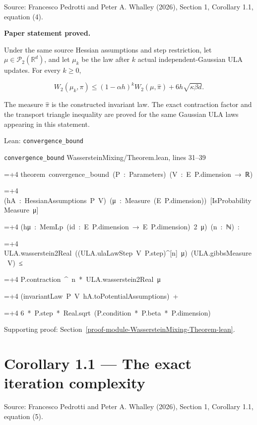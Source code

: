 \documentclass[11pt,a4paper]{report}
\newlength{\leancharwidth}
\newenvironment{leancode}{\par\smallskip\begingroup\ttfamily\footnotesize\raggedright
  \settowidth{\leancharwidth}{M}\setlength{\parskip}{0pt}\setlength{\parindent}{0pt}
  \frenchspacing}{\par\endgroup\smallskip}
\newcommand{\leanline}[2]{\hangindent=\dimexpr#1\leancharwidth+4\leancharwidth\relax
  \hangafter=1\noindent\hspace*{#1\leancharwidth}#2\par}
\newcommand{\leansource}[1]{\par{\footnotesize\color{leanmuted}#1}\par}
\begin{document}
Source: Francesco Pedrotti and Peter A. Whalley (2026), Section 1, Corollary 1.1, equation (4).



\textbf{Paper statement proved.}



Under the same source Hessian assumptions and step restriction,
let \(\mu\in\mathcal P_2(\mathbb R^d)\), and let \(\mu_k\) be the law after
\(k\) actual independent-Gaussian ULA updates. For every \(k\ge0\),


\[W_2(\mu_k,\pi)\le(1-\alpha h)^kW_2(\mu,\widehat\pi)
+6h\sqrt{\kappa\beta d}.\]


The measure \(\widehat\pi\) is the constructed invariant law. The exact
contraction factor and the transport triangle inequality are proved for the
same Gaussian ULA laws appearing in this statement.

\begin{leanbox}{Lean: \texttt{convergence\_\allowbreak{}bound}}
\leansource{\texttt{convergence\_\allowbreak{}bound} \quad WassersteinMixing/\allowbreak{}Theorem.lean, lines 31–39}
\begin{leancode}
\leanline{0}{theorem\ convergence\_bound\ (P\ :\ Parameters)\ (V\ :\ E\ P.dimension\ →\ ℝ)}
\leanline{4}{(hA\ :\ HessianAssumptions\ P\ V)\ (μ\ :\ Measure\ (E\ P.dimension))\ [IsProbabilityMeasure\ μ]}
\leanline{4}{(hμ\ :\ MemLp\ (id\ :\ E\ P.dimension\ →\ E\ P.dimension)\ 2\ μ)\ (n\ :\ ℕ)\ :}
\leanline{4}{ULA.wasserstein2Real\ ((ULA.ulaLawStep\ V\ P.step)\textasciicircum{}[n]\ μ)\ (ULA.gibbsMeasure\ V)\ ≤}
\leanline{6}{P.contraction\ \textasciicircum{}\ n\ *\ ULA.wasserstein2Real\ μ}
\leanline{8}{(invariantLaw\ P\ V\ hA.toPotentialAssumptions)\ +}
\leanline{10}{6\ *\ P.step\ *\ Real.sqrt\ (P.condition\ *\ P.beta\ *\ P.dimension)}
\end{leancode}
\end{leanbox}

{\small\color{gray}Supporting proof: Section~\ref{proof-module-WassersteinMixing-Theorem-lean}.\par}
\section{\texorpdfstring{Corollary 1.1 — The exact iteration complexity}{Corollary 1.1 — The exact iteration complexity}}


Source: Francesco Pedrotti and Peter A. Whalley (2026), Section 1, Corollary 1.1, equation (5).
\end{document}

